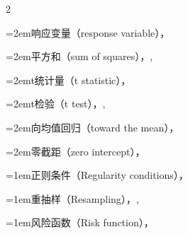 \begin{multicols}{2}
\par\noindent\hangindent=2em\hspace*{1em}\label{idx:906}响应变量（response variable），\hyperref[idxocc:906:467]{\pageref*{idxocc:906:467}}\par
\par\noindent\hangindent=2em\hspace*{1em}\label{idx:907}平方和（sum of squares），\hyperref[eq:11.3.6]{\pageref*{eq:11.3.6}}, \hyperref[eq:11.3.36]{\pageref*{eq:11.3.36}}\par
\par\noindent\hangindent=2em\hspace*{1em}\label{idx:908}t统计量（t statistic），\hyperref[eq:11.3.33]{\pageref*{eq:11.3.33}}\par
\par\noindent\hangindent=2em\hspace*{1em}\label{idx:909}t检验（t test），\hyperref[eq:11.3.35]{\pageref*{eq:11.3.35}}, \hyperref[eq:11.3.38]{\pageref*{eq:11.3.38}}\par
\par\noindent\hangindent=2em\hspace*{1em}\label{idx:910}向均值回归（toward the mean），\hyperref[idxocc:910:467]{\pageref*{idxocc:910:467}}\par
\par\noindent\hangindent=2em\hspace*{1em}\label{idx:911}零截距（zero intercept），\hyperref[exercise:7.19]{\pageref*{exercise:7.19}}\par
\par\addvspace{2pt}
\par\noindent\hangindent=1em\hspace*{0em}\label{idx:912}正则条件（Regularity conditions），\hyperref[sec:10.6.2]{\pageref*{sec:10.6.2}}\par
\par\addvspace{2pt}
\par\noindent\hangindent=1em\hspace*{0em}\label{idx:913}重抽样（Resampling），\hyperref[ex:10.1.19]{\pageref*{ex:10.1.19}}, \hyperref[eq:10.1.11]{\pageref*{eq:10.1.11}}\par
\par\addvspace{2pt}
\par\noindent\hangindent=1em\hspace*{0em}\label{idx:914}风险函数（Risk function），\hyperref[eq:7.3.16]{\pageref*{eq:7.3.16}}\par

\end{multicols}
